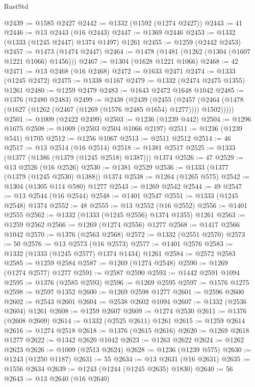 \begin{lexlean}{RustStd}
\begin{coremodule}
@2439 := @1585 @2427
@2442 := @1332 (@1592 (@1274 @2427))
@2443 := 41
@2446 := @13 @2443 (@16 @2443)
@2447 := @1369 @2446
@2453 := @1332 (@1333 (@1245 @2447) @1374 @1497) @1261
@2455 := @1259 (@2442 @2453)
@2457 := @1473 (@1474 @2447)
@2464 := @1478 (@1481 (@1262 (@1304 (@1607 @1221 @1066) @1456)))
@2467 := @1304 (@1628 @1221 @1066)
@2468 := 42
@2471 := @13 @2468 (@16 @2468)
@2472 := @1633 @2471
@2474 := @1333 (@1245 @2472)
@2475 := @1338 @1167
@2479 := @1332 (@2474 @2475 @1355) @1261
@2480 := @1259 @2479
@2483 := @1643 @2472 @1648 @1042
@2485 := @1376 (@2480 @2483)
@2499 := @2438
    (@2439
      (@2455
        (@2457 (@2464 (@1478 (@1627 (@1262 (@2467 (@1269 (@1576 @2485 @1654) @1277)))) @1502)))))
@2501 := @1009 (@2422 @2499)
@2503 := @1236 (@1239 @442)
@2504 := @1296 @1675
@2508 := @1009 (@2503 @2504 @1066 @2197)
@2511 := @1236 (@1239 @541) @1705
@2512 := @1256 @1067
@2513 := @2511 @2512
@2514 := 46
@2517 := @13 @2514 (@16 @2514)
@2518 := @1381 @2517
@2525 := @1333 (@1377 (@1386 (@1379 (@1245 @2518) @1387))) @1374
@2526 := 47
@2529 := @13 @2526 (@16 @2526)
@2530 := @1381 @2529
@2536 := @1333 (@1377 (@1379 (@1245 @2530) @1388)) @1374
@2538 := @1264 (@1265 @575)
@2542 := @1304 (@1305 @114 @580) @1277
@2543 := @1269 @2542
@2544 := 49
@2547 := @13 @2544 (@16 @2544)
@2548 := @1401 @2547
@2551 := @1333 (@1245 @2548) @1374
@2552 := 48
@2555 := @13 @2552 (@16 @2552)
@2556 := @1401 @2555
@2562 := @1332 (@1333 (@1245 @2556) @1374 @1355) @1261
@2563 := @1259 @2562
@2566 := @1269 (@1274 @2556) @1277
@2568 := @1417 @2566 @1042
@2570 := @1376 (@2563 @2568)
@2572 := @1332 (@2551 @2570)
@2573 := 50
@2576 := @13 @2573 (@16 @2573)
@2577 := @1401 @2576
@2583 := @1332 (@1333 (@1245 @2577) @1374 @1434) @1261
@2584 := @2572 @2583
@2585 := @1259 @2584
@2587 := @1269 (@1274 @2548)
@2590 := @1269 (@1274 @2577) @1277
@2591 := @2587 @2590
@2593 := @1442 @2591 @1094
@2595 := @1376 (@2585 @2593)
@2596 := @1269 @2595
@2597 := @1576 @1275
@2598 := @2597 @1352
@2600 := @1269 @2598 @1277
@2601 := @2596 @2600
@2602 := @2543 @2601
@2604 := @2538 @2602 @1094
@2607 := @1332 (@2536 @2604) @1261
@2608 := @1259 @2607
@2609 := @1274 @2530
@2611 := @1376 (@2608 @2609)
@2614 := @1332 (@2525 @2611) @1261
@2615 := @1259 @2614
@2616 := @1274 @2518
@2618 := @1376 (@2615 @2616)
@2620 := @1269 @2618 @1277
@2622 := @1342 @2620 @1042
@2623 := @1263 @2622
@2624 := @1262 @2623
@2626 := @1009 (@2513 @2624)
@2628 := @1236 (@1239 @575)
@2630 := @1243 (@1250 @1187)
@2631 := 55
@2634 := @13 @2631 (@16 @2631)
@2635 := @1556 @2634
@2639 := @1243 (@1244 (@1245 @2635) @1830)
@2640 := 56
@2643 := @13 @2640 (@16 @2640)

\end{coremodule}
\end{lexlean}
